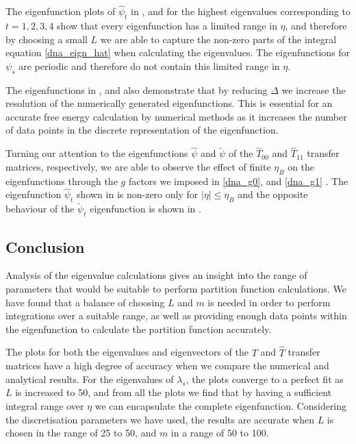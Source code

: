 The eigenfunction plots of $\hat{\psi}_t$ in , and  for the highest eigenvalues corresponding to $t=1,2,3,4$ show that every eigenfunction has a limited range in $\eta$, and therefore by choosing a small $L$ we are able to capture the non-zero parts of the integral equation \eqref{dna_eign_hat} when calculating the eigenvalues. The eigenfunctions for $\psi_s$ are periodic and therefore do not contain this limited range in $\eta$. 

The eigenfunctions in , and  also demonstrate that by reducing $\Delta$ we increase the resolution of the numerically generated eigenfunctions. This is essential for an accurate free energy calculation by numerical methods as it increases the number of data points in the discrete representation of the eigenfunction.

Turning our attention to the eigenfunctions $\hat{\psi}$ and $\tilde{\psi}$ of the $\hat{T}_{00}$ and $\hat{T}_{11}$ transfer matrices, respectively, we are able to observe the effect of finite $\eta_B$ on the eigenfunctions through the $g$ factors we imposed in \eqref{dna_g0}, and \eqref{dna_g1} . The eigenfunction $\hat{\psi}_t$ shown in  is non-zero only for $|\eta | \leq \eta_{B}$ and the opposite behaviour of the $\tilde{\psi}_t$ eigenfunction is shown in .

\subsection{Conclusion}

Analysis of the eigenvalue calculations gives an insight into the range of parameters that would be suitable to perform partition function calculations. We have found that a balance of choosing $L$ and $m$ is needed in order to perform integrations over a suitable range, as well as providing enough data points within the eigenfunction to calculate the partition function accurately.

The plots for both the eigenvalues and eigenvectors of the $T$ and $\hat{T}$ transfer matrices have a high degree of accuracy when we compare the numerical and analytical results. For the eigenvalues of $\lambda_s$, the plots converge to a perfect fit as $L$ is increased to 50, and from all the plots we find that by having a sufficient integral range over $\eta$ we can encapsulate the complete eigenfunction. Considering the discretisation parameters we have used, the results are accurate when $L$ is chosen in the range of 25 to 50, and $m$ in a range of 50 to 100. 


